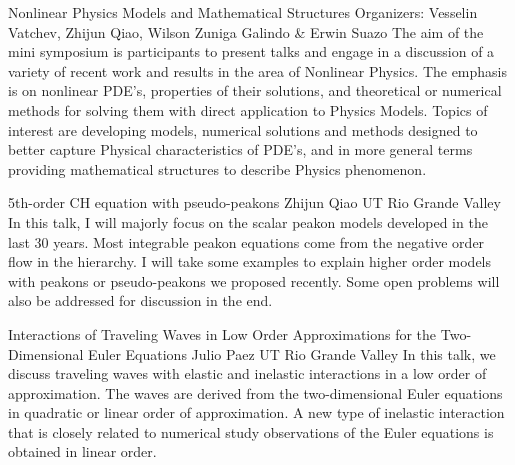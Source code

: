 \label{mini24}


\miniabs
{Nonlinear Physics Models and Mathematical Structures}
{Organizers: Vesselin Vatchev, Zhijun Qiao, Wilson Zuniga Galindo \& Erwin Suazo}
{The aim of the mini symposium is participants to present talks and engage in a discussion of a variety of recent work and results in the area of Nonlinear Physics. The emphasis is on nonlinear PDE’s, properties of their solutions, and theoretical or numerical methods for solving them with direct application to Physics Models. Topics of interest are developing models, numerical solutions and methods designed to better capture Physical characteristics of PDE’s, and in more general terms providing mathematical structures to describe Physics phenomenon.}

\begin{addmargin}[2em]{0em}
\vspace{2ex}
\abs
{5th-order CH equation with pseudo-peakons}
{Zhijun Qiao }
{UT Rio Grande Valley}
{In this talk, I will majorly focus on the scalar peakon models developed in the last 30 years. Most integrable peakon equations come from the negative order flow in the hierarchy. I will take some examples to explain higher order models with peakons or pseudo-peakons we proposed recently. Some open problems will also be addressed for discussion in the end.}


\vspace{1.5ex}
\abs
{Interactions of Traveling Waves in Low Order Approximations
for the Two-Dimensional Euler Equations}
{Julio Paez}
{UT Rio Grande Valley}
{In this talk, we discuss traveling waves with elastic and inelastic interactions in a low order of approximation. The waves are derived from the two-dimensional Euler equations in quadratic or linear order of approximation.  A new type of inelastic interaction that is closely related to numerical study observations of the Euler equations is obtained in linear order.}



\end{addmargin}
